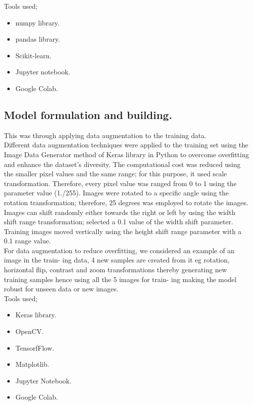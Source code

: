 \documentclass[11pt]{report}
\begin{document}
Tools used;
\begin{itemize}
	\item numpy library.
	\item pandas library.
	\item Scikit-learn.
	\item Jupyter notebook.
	\item Google Colab.
\end{itemize}



\subsection{Model formulation and building.}
This was through applying data augmentation to the training data.\\

Different data augmentation techniques were applied to the training set using the Image Data
Generator method of Keras library in Python to overcome overfitting and enhance the dataset’s
diversity. The computational cost was reduced using the smaller pixel values and the same
range; for this purpose, it used scale transformation. Therefore, every pixel value was ranged
from 0 to 1 using the parameter value (1./255). Images were rotated to a specific angle using
the rotation transformation; therefore, 25 degrees was employed to rotate the images. Images can shift
randomly either towards the right or left by using the width shift range transformation; selected
a 0.1 value of the width shift parameter. Training images moved vertically using the height shift
range parameter with a 0.1 range value.\\

For data augmentation to reduce overfitting, we considered an example of an image in the train-
ing data, 4 new samples are created from it eg rotation, horizontal flip, contrast and zoom
transformations thereby generating new training samples hence using all the 5 images for train-
ing making the model robust for unseen data or new images.\\

Tools used;
\begin{itemize}
	\item Keras library.
	\item OpenCV.
	\item TensorfFlow.
	\item Matplotlib.
	\item Jupyter Notebook.
	\item Google Colab.
\end{itemize}
\end{document}
